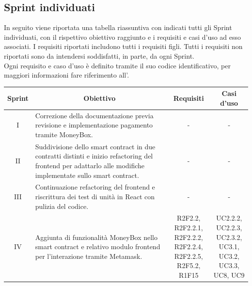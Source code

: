 \subsection{Sprint individuati} \label{subsection:sprint}
In seguito viene riportata una tabella riassuntiva con indicati tutti gli Sprint\glo{} individuati, con il rispettivo obiettivo raggiunto e i requisiti e casi d'uso ad esso associati.
I requisiti riportati includono tutti i requisiti figli. Tutti i requisiti non riportati sono da intendersi soddisfatti, in parte, da
ogni Sprint\glo{}. \\
Ogni requisito e caso d'uso è definito tramite il suo codice identificativo, per maggiori informazioni fare riferimento all'\docNameVersionAdR{}.

\begin{table}[H]
  \centering
  \renewcommand{\arraystretch}{1.8}
  \begin{tabular}{c|p{6cm}|c|c}
    \rowcolor[HTML]{125E28}
    \color[HTML]{FFFFFF}\textbf{Sprint}
        & \multicolumn{1}{c}{\color[HTML]{FFFFFF}\textbf{Obiettivo}}
        & \multicolumn{1}{c}{\color[HTML]{FFFFFF}\textbf{Requisiti}}
        & \multicolumn{1}{c}{\color[HTML]{FFFFFF}\textbf{Casi d'uso}}                                                                                                                                                                    \\
    \hline
    I   & Correzione della documentazione previa revisione \RTB{} e implementazione pagamento tramite MoneyBox\glo{}.                                                                           & -                                  & - \\
    II  & Suddivisione dello smart contract\glo{} in due contratti distinti e inizio refactoring\glo{} del frontend\glo{} per adattarlo alle modifiche implementate sullo smart contract\glo{}. & -                                  & - \\
    III & Continuazione refactoring\glo{} del frontend\glo{} e riscrittura dei test di unità in React\glo{} con pulizia del codice.                                                             & -                                  & - \\
    IV  & Aggiunta di funzionalità MoneyBox\glo{} nello smart contract\glo{} e relativo modulo frontend\glo{} per l'interazione tramite Metamask\glo{}.                                         & \Shortunderstack{R2F2.2, R2F2.2.1,     \\R2F2.2.2, R2F2.2.4,\\R2F2.2.5, R2F5.2,\\R1F15\\} & \Shortunderstack{UC2.2.2, UC2.2.3,\\UC2.3.2, UC3.1,\\UC3.2, UC3.3,\\UC8, UC9\\}\\

\end{tabular}
\end{table}
